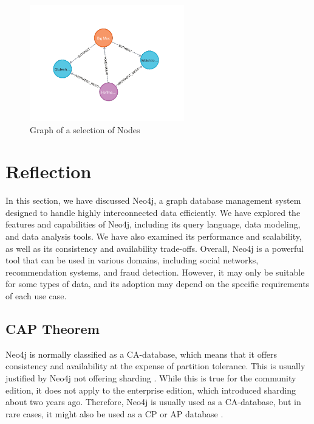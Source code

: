 \begin{figure}[H]
    \centering
    \caption{Graph of a selection of Nodes} \label{fig:neo4jGraph_2}
    \includegraphics[width=0.6\textwidth]{images/neo4j_example_graph_2.png}
\end{figure}

\section{Reflection} \label{sec:reflectionNeo4j}

In this section, we have discussed Neo4j, a graph database management system designed to handle highly interconnected data efficiently. We have explored the features and capabilities of Neo4j, including its query language, data modeling, and data analysis tools. We have also examined its performance and scalability, as well as its consistency and availability trade-offs. Overall, Neo4j is a powerful tool that can be used in various domains, including social networks, recommendation systems, and fraud detection. However, it may only be suitable for some types of data, and its adoption may depend on the specific requirements of each use case.

\subsection{CAP Theorem} \label{subsec:capTheoremNeo4j}

Neo4j is normally classified as a \ac{CA}-database, which means that it offers consistency and availability at the expense of partition tolerance. This is usually justified by Neo4j not offering sharding \parencite{cap_neo4j}. While this is true for the community edition, it does not apply to the enterprise edition, which introduced sharding about two years ago. Therefore, Neo4j is usually used as a \ac{CA}-database, but in rare cases, it might also be used as a \ac{CP} or \ac{AP} database \parencite{consistency_models_cap_neo4j}.

